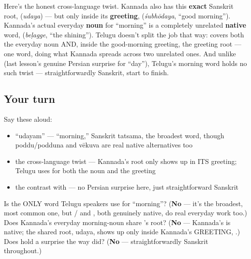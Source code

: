\begin{culture}
Here's the honest cross-language twist. Kannada also has this \textbf{exact} Sanskrit root, \textbf{} (\emph{udaya}) — but only inside its \textbf{greeting}, \textbf{} (\emph{śubhōdaya}, \textquotedblleft{}good morning\textquotedblright{}). Kannada's actual everyday \textbf{noun} for \textquotedblleft{}morning\textquotedblright{} is a completely unrelated \textbf{native} word, \textbf{} (\emph{beḷagge}, \textquotedblleft{}the shining\textquotedblright{}). Telugu doesn't split the job that way: \textbf{} covers both the everyday noun AND, inside the good-morning greeting, the greeting root — one word, doing what Kannada spreads across two unrelated ones. And unlike \textbf{} (last lesson's genuine Persian surprise for \textquotedblleft{}day\textquotedblright{}), Telugu's morning word holds no such twist — straightforwardly Sanskrit, start to finish.
\end{culture}

\subsection*{Your turn}
Say these aloud:

\begin{itemize}
\raggedright
  \item \textquotedblleft{}udayam\textquotedblright{} — \textquotedblleft{}morning,\textquotedblright{} Sanskrit tatsama, the broadest word, though poddu/podduna and vēkuva are real native alternatives too
  \item the cross-language twist — Kannada's  root only shows up in ITS greeting; Telugu uses  for both the noun and the greeting
  \item the contrast with  — no Persian surprise here, just straightforward Sanskrit
\end{itemize}

\begin{tcolorbox}[breakable,colback=teal!4,colframe=teal!35!black,title={Before you move on}]
Is  the ONLY word Telugu speakers use for \textquotedblleft{}morning\textquotedblright{}? (\textbf{No} — it's the broadest, most common one, but / and , both genuinely native, do real everyday work too.) Does Kannada's everyday morning-noun share 's root? (\textbf{No} — Kannada's  is native; the shared root, udaya, shows up only inside Kannada's GREETING, .) Does  hold a surprise the way  did? (\textbf{No} — straightforwardly Sanskrit throughout.)
\end{tcolorbox}
